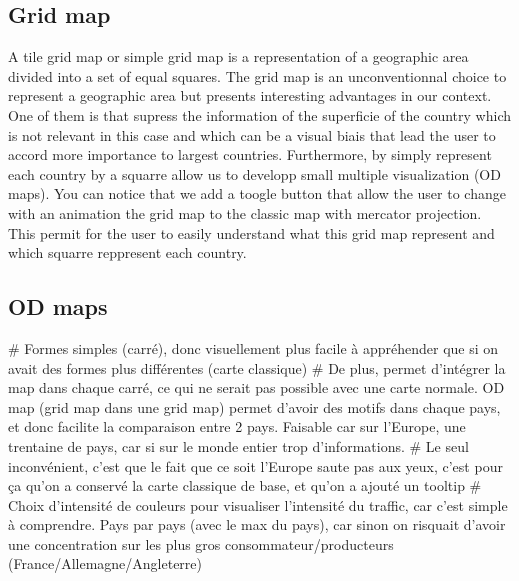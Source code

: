 \documentclass{vgtc}
\begin{document}
\subsection{Grid map}
A tile grid map or simple grid map is a representation of a geographic area divided into a set of equal squares\cite{Good Data Visualization Practice: Tile Grid Maps}.
The grid map is an unconventionnal choice to represent a geographic area but presents interesting advantages in our context. One of them is that supress the information of the superficie of the country which is not relevant in this case and which can be a visual biais that lead the user to accord more importance to largest countries. Furthermore, by simply represent each country by a squarre allow us to developp small multiple visualization (OD maps). You can notice that we add a toogle button that allow the user to change with an animation the grid map to the classic map with mercator projection. This permit for the user to easily understand what this grid map represent and which squarre reppresent each country. 


\subsection{OD maps}
# Formes simples (carré), donc visuellement plus facile à appréhender que si on avait des formes plus différentes (carte classique)
# De plus, permet d'intégrer la map dans chaque carré, ce qui ne serait pas possible avec une carte normale. OD map (grid map dans une grid map) permet d'avoir des motifs dans chaque pays, et donc facilite la comparaison entre 2 pays. Faisable car sur l'Europe, une trentaine de pays, car si sur le monde entier trop d'informations. 
# Le seul inconvénient, c'est que le fait que ce soit l'Europe saute pas aux yeux, c'est pour ça qu'on a conservé la carte classique de base, et qu'on a ajouté un tooltip  
# Choix d'intensité de couleurs pour visualiser l'intensité du traffic, car c'est simple à comprendre. Pays par pays (avec le max du pays), car sinon on risquait d'avoir une concentration sur les plus gros consommateur/producteurs (France/Allemagne/Angleterre)
\end{document}
